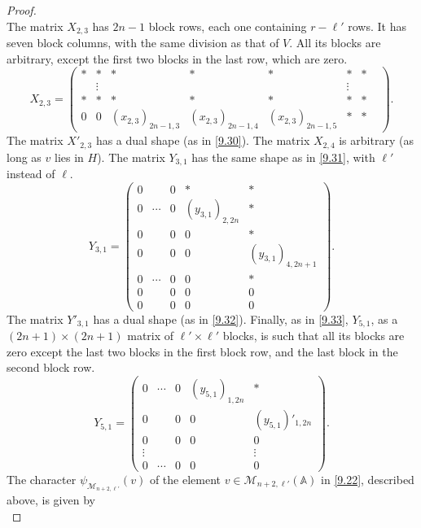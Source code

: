 \documentclass[12pts]{amsart}
\newcommand{\BA}{{\mathbb {A}}}
\begin{document}
\begin{proof}
\begin{equation}
\end{equation}
The matrix $X_{2,3}$ has $2n-1$ block rows, each one containing $r-\ell'$ rows. It has seven block columns, with the same division as that of $V$. All its blocks are arbitrary, except the first two blocks in the last row, which are zero.
\begin{equation}\label{9.79}
X_{2,3}=\begin{pmatrix}\ast&\ast&\ast&\ast&\ast&\ast&\ast\\&\vdots&&&&\vdots&&\\\ast&\ast&\ast&\ast&\ast&\ast&\ast\\0&0&(x_{2,3})_{2n-1,3}&(x_{2,3})_{2n-1,4}&(x_{2,3})_{2n-1,5}&\ast&\ast\end{pmatrix}.
\end{equation}
The matrix $X'_{2,3}$ has a dual shape (as in \eqref{9.30}). 
The matrix $X_{2,4}$ is arbitrary (as long as $v$ lies in $H$). The matrix $Y_{3,1}$ has the same shape as in \eqref{9.31}, with $\ell'$ instead of $\ell$. 
\begin{equation}\label{9.80}
Y_{3,1}=\begin{pmatrix}0&&0&\ast&\ast\\0&\cdots&0&(y_{3,1})_{2,2n}&\ast\\
0&&0&0&\ast\\0&&0&0&(y_{3,1})_{4,2n+1}\\0&\cdots&0&0&\ast\\0&&0&0&0\\0&&0&0&0\end{pmatrix}.
\end{equation}
The matrix $Y'_{3,1}$ has a dual shape (as in \eqref{9.32}).
Finally, as in \eqref{9.33}, $Y_{5,1}$, as a $(2n+1)\times (2n+1)$ matrix of $\ell'\times \ell'$ blocks, is such that all its blocks are zero except the last two blocks in the first block row, and the last block in the second block row.
\begin{equation}\label{9.81}
Y_{5,1}=\begin{pmatrix}0&\cdots&0&(y_{5,1})_{1,2n}&\ast\\0&&0&0&(y_{5,1})'_{1,2n}\\0&&0&0&0\\\vdots&&&&\vdots\\0&\cdots&0&0&0\end{pmatrix}.
\end{equation}
The character $\psi_{\mathcal{M}_{n+2,\ell'}}(v)$ of the element $v\in \mathcal{M}_{n+2,\ell'}(\BA)$ in \eqref{9.22}, described above, is given by
\begin{equation}\label{9.82}

\end{equation}
\end{proof}
\end{document}
